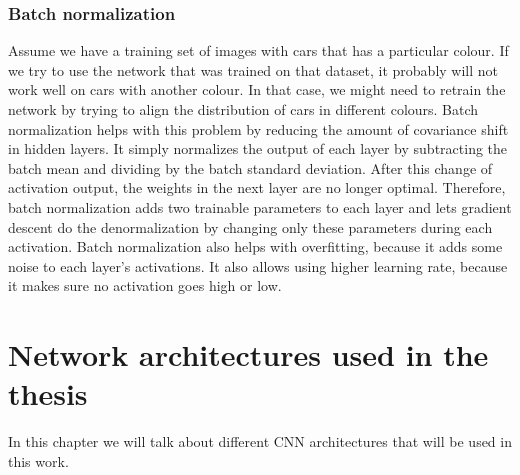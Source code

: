 \documentclass[twoside]{ctuthesis}
\theoremstyle{plain}
\theoremstyle{definition}
\theoremstyle{note}
\begin{document}
\subsection{Batch normalization}
Assume we have a training set of images with cars that has a particular colour. If we try to use the network that was trained on that dataset, it probably will not work well on cars with another colour. In that case, we might need to retrain the network by trying to align the distribution of cars in different colours. Batch normalization helps with this problem by reducing the amount of covariance shift in hidden layers\cite{Ioffe2015BatchNA}. It simply normalizes the output of each layer by subtracting the batch mean and dividing by the batch standard deviation.
After this change of activation output, the weights in the next layer are no longer optimal. Therefore, batch normalization adds two trainable parameters to each layer and lets gradient descent do the denormalization by changing only these parameters during each activation. 
Batch normalization also helps with overfitting, because it adds some noise to each layer's activations. It also allows using higher learning rate, because it makes sure no activation goes high or low. 
\chapter{Network architectures used in the thesis}

In this chapter we will talk about different CNN architectures that will be used in this work. 
\end{document}

